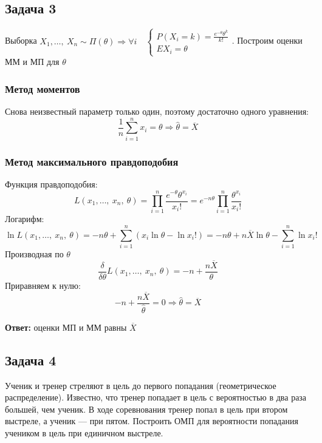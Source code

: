 \documentclass[12pt, a4paper]{article}
\begin{document}
\subsection*{Задача 3}
Выборка $X_1,\dots,\ X_n \sim \Pi(\theta)\Rightarrow \forall i\quad \begin{cases}
        P(X_i = k) = \frac{e^{-\theta} \theta^k}{k!} \\
        EX_i = \theta
    \end{cases}$. Построим оценки ММ и МП для $\theta$
\subsubsection*{Метод моментов}
Снова неизвестный параметр только один, поэтому достаточно одного уравнения:
\begin{equation*}
    \frac{1}{n} \sum_{i = 1}^{n} x_i = \theta\Rightarrow \hat \theta = \overline{X}
\end{equation*}
\subsubsection*{Метод максимального правдоподобия}
Функция правдоподобия:
\begin{equation*}
    L(x_1,\dots,\ x_n,\ \theta) = \prod_{i = 1}^{n} \frac{e^{-\theta} \theta^{x_i}}{x_i!} = e^{-n\theta} \prod_{i = 1}^{n} \frac{\theta^{x_i}}{x_i!}
\end{equation*}
Логарифм:
\begin{equation*}
    \ln L(x_1,\dots,\ x_n,\ \theta) = -n\theta + \sum_{i = 1}^{n} (x_i\ln \theta - \ln x_i!) = -n\theta + n\overline{X}\ln\theta  - \sum_{i = 1}^{n} \ln x_i!
\end{equation*}
Производная по $\theta$
\begin{equation*}
    \frac{\delta}{\delta \theta} L(x_1,\dots,\ x_n,\ \theta) = -n + \frac{n\overline{X}}{\theta}
\end{equation*}
Приравняем к нулю:
\begin{equation*}
    -n + \frac{n\overline{X}}{\hat\theta} = 0 \Rightarrow \hat\theta = \overline{X}
\end{equation*}

\textbf{Ответ:} оценки МП и ММ равны $\overline{X}$
\subsection*{Задача 4}
Ученик и тренер стреляют в цель до первого попадания (геометрическое распределение). Известно, что тренер попадает в цель с вероятностью в два раза большей, чем ученик. В ходе соревнования тренер попал в цель при втором выстреле, а ученик --- при пятом. Построить ОМП для вероятности попадания учеником в цель при единичном выстреле.\\
\end{document}

